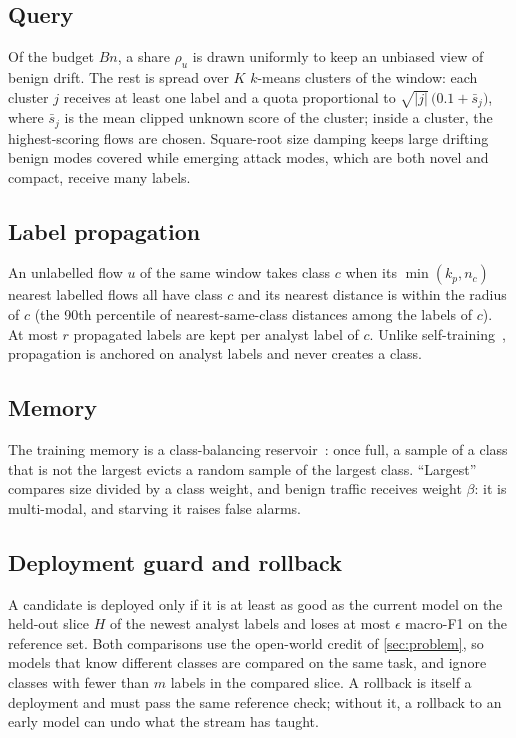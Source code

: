 \subsection{Query}
\label{sec:query}
Of the budget $Bn$, a share $\rho_u$ is drawn uniformly to keep an unbiased view of benign drift. The rest is
spread over $K$ $k$-means clusters of the window: each cluster $j$ receives at least one label and a quota
proportional to $\sqrt{|j|}\,\bigl(0.1 + \bar{s}_j\bigr)$, where $\bar{s}_j$ is the mean clipped unknown score of
the cluster; inside a cluster, the highest-scoring flows are chosen. Square-root size damping keeps large drifting
benign modes covered while emerging attack modes, which are both novel and compact, receive many labels.

\subsection{Label propagation}
\label{sec:prop}
An unlabelled flow $u$ of the same window takes class $c$ when its $\min(k_p, n_c)$ nearest labelled flows all have
class $c$ and its nearest distance is within the radius of $c$ (the 90th percentile of nearest-same-class distances
among the labels of $c$). At most $r$ propagated labels are kept per analyst label of $c$. Unlike
self-training~\cite{andresini2021insomnia,zhang2024aoc}, propagation is anchored on analyst labels and never
creates a class.

\subsection{Memory}
\label{sec:memory}
The training memory is a class-balancing reservoir~\cite{chrysakis2020online}: once full, a sample of a class that is
not the largest evicts a random sample of the largest class. ``Largest'' compares size divided by a class weight,
and benign traffic receives weight $\beta$: it is multi-modal, and starving it raises false alarms.

\subsection{Deployment guard and rollback}
\label{sec:guard}
A candidate is deployed only if it is at least as good as the current model on the held-out slice $H$ of the newest
analyst labels and loses at most $\epsilon$ macro-F1 on the reference set. Both comparisons use the open-world
credit of \cref{sec:problem}, so models that know different classes are compared on the same task, and ignore
classes with fewer than $m$ labels in the compared slice. A rollback is itself a deployment and must pass the same
reference check; without it, a rollback to an early model can undo what the stream has taught.
